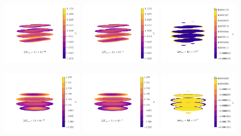 \documentclass[fleqn,usenatbib]{mnras}
\begin{document}
\begin{figure}
  \centering
  \includegraphics[width=0.3\textwidth]{figs/db-likelihood.pdf}\hfill
  \includegraphics[width=0.3\textwidth]{figs/db-harmonic.pdf}\hfill
  \includegraphics[width=0.3\textwidth]{figs/db-lumpy.pdf}

  \includegraphics[width=0.3\textwidth]{figs/sym-ell-likelihood.pdf}\hfill
  \includegraphics[width=0.3\textwidth]{figs/sym-ell-harmonic.pdf}\hfill
  \includegraphics[width=0.3\textwidth]{figs/sym-ell-lumpy.pdf}


\end{figure}
\end{document}
